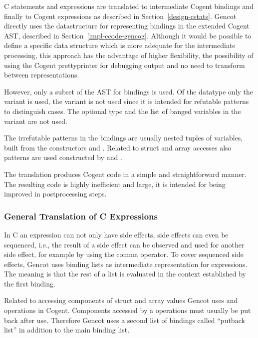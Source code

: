 C statements and expressions are translated to intermediate Cogent bindings and finally to Cogent expressions 
as described in Section~\ref{design-cstats}. Gencot directly uses the datastructure for representing bindings 
in the extended Cogent AST, described in Section~\ref{impl-ccode-gencog}. Although it would be possible
to define a specific data structure which is more adequate for the intermediate processing, this approach has
the advantage of higher flexibility, the possibility of using the Cogent prettyprinter for debugging output
and no need to transform between representations.

However, only a subset of the AST for bindings is used. Of the datatype  only the variant 
 is used, the variant  is not used since it is intended for refutable patterns 
to distinguish cases. The optional type and the list of banged variables in the  variant are not used.

The irrefutable patterns in the bindings are usually nested tuples of variables, built from the constructors
 and . Related to struct and array accesses also  patterns are used constructed 
by  and .

The translation produces Cogent code in a simple and straightforward manner. The resulting code is highly inefficient 
and large, it is intended for being improved in postprocessing steps.

\subsubsection{General Translation of C Expressions}

In C an expression can not only have side effects, side effects can even be sequenced, i.e., the result of a side
effect can be observed and used for another side effect, for example by using the comma operator. To cover sequenced 
side effects, Gencot uses binding lists as intermediate representation for expressions. The meaning is that the 
rest of a list is evaluated in the context established by the first binding. 

Related to accessing components of struct and array values Gencot uses  and  operations in Cogent.
Components accessed by a  operations must usually be put back after use. Therefore Gencot uses a second
list of bindings called ``putback list'' in addition to the main binding list. 

